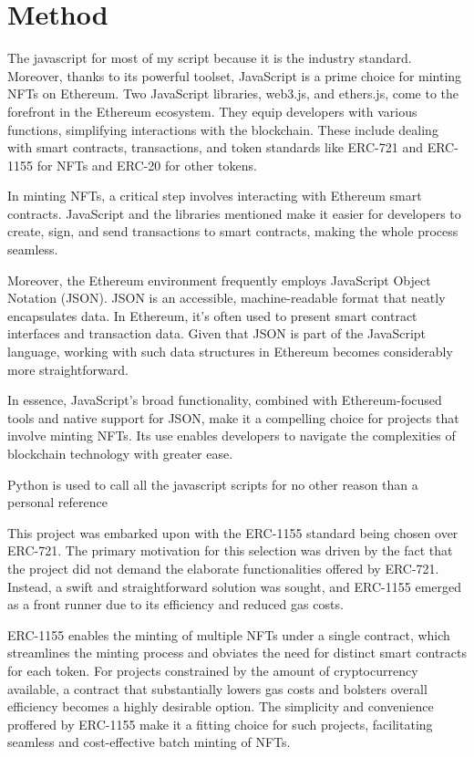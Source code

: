 \documentclass[10pt,twocolumn]{article}
\begin{document}
\section{Method}
The javascript for most of my script because it is the industry standard. Moreover, thanks to its powerful toolset, JavaScript is a prime choice for minting NFTs on Ethereum. Two JavaScript libraries, web3.js, and ethers.js, come to the forefront in the Ethereum ecosystem. They equip developers with various functions, simplifying interactions with the blockchain. These include dealing with smart contracts, transactions, and token standards like ERC-721 and ERC-1155 for NFTs and ERC-20 for other tokens. 

In minting NFTs, a critical step involves interacting with Ethereum smart contracts. JavaScript and the libraries mentioned make it easier for developers to create, sign, and send transactions to smart contracts, making the whole process seamless.

Moreover, the Ethereum environment frequently employs JavaScript Object Notation (JSON). JSON is an accessible, machine-readable format that neatly encapsulates data. In Ethereum, it's often used to present smart contract interfaces and transaction data. Given that JSON is part of the JavaScript language, working with such data structures in Ethereum becomes considerably more straightforward.

In essence, JavaScript's broad functionality, combined with Ethereum-focused tools and native support for JSON, make it a compelling choice for projects that involve minting NFTs. Its use enables developers to navigate the complexities of blockchain technology with greater ease.  

 Python is used  to call all the javascript scripts for no other reason than a personal reference 

This project was embarked upon with the ERC-1155 standard being chosen over ERC-721. The primary motivation for this selection was driven by the fact that the project did not demand the elaborate functionalities offered by ERC-721. Instead, a swift and straightforward solution was sought, and ERC-1155 emerged as a front runner due to its efficiency and reduced gas costs.

ERC-1155 enables the minting of multiple NFTs under a single contract, which streamlines the minting process and obviates the need for distinct smart contracts for each token. For projects constrained by the amount of cryptocurrency available, a contract that substantially lowers gas costs and bolsters overall efficiency becomes a highly desirable option. The simplicity and convenience proffered by ERC-1155 make it a fitting choice for such projects, facilitating seamless and cost-effective batch minting of NFTs.\cite{ERC-721_vs_ERC-1155}
\end{document}

